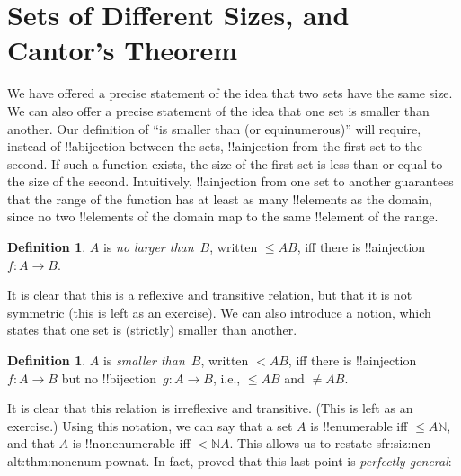 \documentclass[10pt,a4paper]{article}
\makeatletter
\theoremstyle{plain}
\theoremstyle{definition}
\newtheorem{defn}[thm]{Definition}
\theoremstyle{remark}
\newenvironment{explain}{}{}
\newcommand*{\olfileid}[3]{}
\newcommand*{\olsection}[1]{\section*{#1}}
\newcommand{\olref}{\@ifnextchar[{\olref@i}{\olref@final}}
\def\olref@i[#1]{\@ifnextchar[{\olref@ii}{\olref@final}}
\def\olref@ii[#1]{\@ifnextchar[{\olref@iii}{\olref@final}}
\def\olref@iii[#1]{\olref@final}
\def\olref@final#1{\ref{#1}}
\providecommand{\Nat}{\ensuremath{\mathbb{N}}}
\providecommand{\cardle}{\leq}
\providecommand{\PosInt}{\mathbb{Z}^{+}}
\providecommand{\Pow}{\mathcal{P}}
\providecommand{\oliflabeldef}[3]{#1}
\providecommand{\citet}[1]{\cite{#1}}
\providecommand{\cardneq}{\neq}
\providecommand{\cardless}{<}
\providecommand{\cardless}{<}
\providecommand{\cardneq}{\neq}
\providecommand{\cardle}{\leq}
\makeatother
\begin{document}



\olfileid{sfr}{siz}{car}

\olsection{Sets of Different Sizes, and Cantor's Theorem}

\begin{explain}
We have offered a precise statement of the idea that two sets have the
same size. We can also offer a precise statement of the idea that one
set is smaller than another. Our definition of ``is smaller than (or
equinumerous)'' will require, instead of !!a{bijection} between the
sets, !!a{injection} from the first set to the second. If such a
function exists, the size of the first set is less than or equal to
the size of the second. Intuitively, !!a{injection} from one set to
another guarantees that the range of the function has at least as many
!!{element}s as the domain, since no two !!{element}s of the domain
map to the same !!{element} of the range.
\end{explain}

\begin{defn}
$A$ is \emph{no larger than}~$B$, written $\cardle{A}{B}$, iff there
is !!a{injection} $f \colon A \to B$.
\end{defn}

It is clear that this is a reflexive and transitive relation, but that
it is not symmetric (this is left as an exercise). We can also
introduce a notion, which states that one set is (strictly) smaller
than another. 

\begin{defn}
$A$ is \emph{smaller than}~$B$, written $\cardless{A}{B}$, iff there
is !!a{injection}~$f\colon A \to B$ but no !!{bijection}~$g\colon A
\to B$, i.e., $\cardle{A}{B}$ and $\cardneq{A}{B}$.
\end{defn}

It is clear that this relation is irreflexive
and transitive. (This is left as an exercise.) Using this notation, we
can say that a set $A$ is !!{enumerable} iff $\cardle{A}{\Nat}$, and
that $A$ is !!{nonenumerable} iff $\cardless{\Nat}{A}$. This allows us
to restate
\oliflabeldef{sfr:siz:nen-alt:thm:nonenum-pownat}{%
\olref[sfr][siz][nen-alt]{thm:nonenum-pownat}
as the observation that
$\cardless{\Nat}{\Pow{\Nat}}$}{%
\olref[sfr][siz][nen]{thm:nonenum-pownat}
as the observation that $\cardless{\PosInt}{\Pow{\PosInt}}$}. In fact,
\citet{Cantor1892} proved that this last point is \emph{perfectly
general}:
\end{document}
